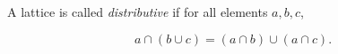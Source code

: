 A lattice is called \textit{distributive} if for all elements $a, b, c$,

$$a \cap (b \cup c) = (a \cap b) \cup (a \cap c).$$
